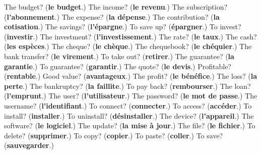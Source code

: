 \begin{tcolorbox}[breakable,colback=teal!4,colframe=teal!35!black,title={Before you move on}]
The budget? (\textbf{le budget}.) The income? (\textbf{le revenu}.) The subscription? (\textbf{l'abonnement}.) The expense? (\textbf{la dépense}.) The contribution? (\textbf{la cotisation}.) The savings? (\textbf{l'épargne}.) To save up? (\textbf{épargner}.) To invest? (\textbf{investir}.) The investment? (\textbf{l'investissement}.) The rate? (\textbf{le taux}.) The cash? (\textbf{les espèces}.) The cheque? (\textbf{le chèque}.) The chequebook? (\textbf{le chéquier}.) The bank transfer? (\textbf{le virement}.) To take out? (\textbf{retirer}.) The guarantee? (\textbf{la garantie}.) To guarantee? (\textbf{garantir}.) The quote? (\textbf{le devis}.) Profitable? (\textbf{rentable}.) Good value? (\textbf{avantageux}.) The profit? (\textbf{le bénéfice}.) The loss? (\textbf{la perte}.) The bankruptcy? (\textbf{la faillite}.) To pay back? (\textbf{rembourser}.) The loan? (\textbf{l'emprunt}.) The user? (\textbf{l'utilisateur}.) The password? (\textbf{le mot de passe}.) The username? (\textbf{l'identifiant}.) To connect? (\textbf{connecter}.) To access? (\textbf{accéder}.) To install? (\textbf{installer}.) To uninstall? (\textbf{désinstaller}.) The device? (\textbf{l'appareil}.) The software? (\textbf{le logiciel}.) The update? (\textbf{la mise à jour}.) The file? (\textbf{le fichier}.) To delete? (\textbf{supprimer}.) To copy? (\textbf{copier}.) To paste? (\textbf{coller}.) To save? (\textbf{sauvegarder}.)
\end{tcolorbox}
